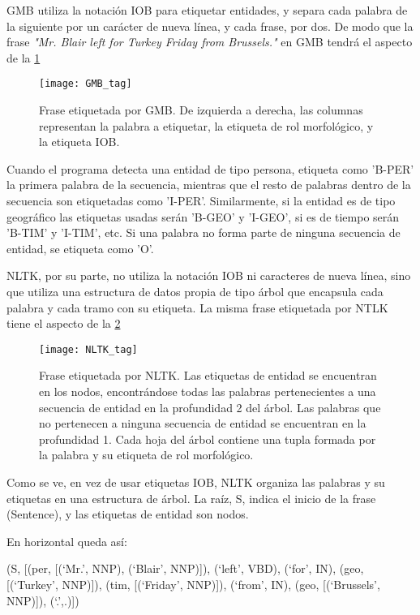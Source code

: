 \documentclass{pre-tfg}
\begin{document}
GMB utiliza la notación IOB para etiquetar entidades, y separa cada palabra de la siguiente por un carácter de nueva línea, y cada frase, por dos. De modo que la frase \textit{"Mr. Blair left for Turkey Friday from Brussels."} en GMB tendrá el aspecto de la \ref{fig:tags1}

\begin{figure}[h]
	\label{fig:tags1}
	\texttt{[image: GMB\_tag]}
	\caption{Frase etiquetada por GMB. De izquierda a derecha, las columnas representan la palabra a etiquetar, la etiqueta de rol morfológico, y la etiqueta IOB.}
	\centering
\end{figure}

Cuando el programa detecta una entidad de tipo persona, etiqueta como 'B-PER' la primera palabra de la secuencia, mientras que el resto de palabras dentro de la secuencia son etiquetadas como 'I-PER'. Similarmente, si la entidad es de tipo geográfico las etiquetas usadas serán 'B-GEO' y 'I-GEO', si es de tiempo serán 'B-TIM' y 'I-TIM', etc. Si una palabra no forma parte de ninguna secuencia de entidad, se etiqueta como 'O'.

NLTK, por su parte, no utiliza la notación IOB  ni caracteres de nueva línea, sino que utiliza una estructura de datos propia de tipo árbol que encapsula cada palabra y cada tramo con su etiqueta. La misma frase etiquetada por NTLK tiene el aspecto de la \ref{fig:tags2}

\begin{figure}[h]
	\label{fig:tags2}
	\texttt{[image: NLTK\_tag]}
	\caption{Frase etiquetada por NLTK. Las etiquetas de entidad se encuentran en los nodos, encontrándose todas las palabras pertenecientes a una secuencia de entidad en la profundidad 2 del árbol. Las palabras que no pertenecen a ninguna secuencia de entidad se encuentran en la profundidad 1. Cada hoja del árbol contiene una tupla formada por la palabra y su etiqueta de rol morfológico.}
	\centering
\end{figure}

Como se ve, en vez de usar etiquetas IOB, NLTK organiza las palabras y su etiquetas en una estructura de árbol. La raíz, S, indica el inicio de la frase (Sentence), y las etiquetas de entidad son nodos.

En horizontal queda así:

(S, [(per, [(‘Mr.’, NNP), (‘Blair’, NNP)]), (‘left’, VBD), (‘for’, IN), (geo, [(‘Turkey’, NNP)]), (tim, [(‘Friday’, NNP)]), (‘from’, IN), (geo, [(‘Brussels’, NNP)]), (‘.’,.)])
\end{document}
